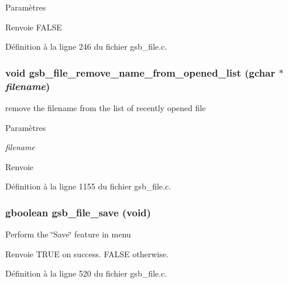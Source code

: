 \begin{DoxyParams}{Paramètres}
\item[{\em }]\end{DoxyParams}
\begin{DoxyReturn}{Renvoie}
FALSE 
\end{DoxyReturn}


Définition à la ligne 246 du fichier gsb\_\-file.c.

\subsubsection[{gsb\_\-file\_\-remove\_\-name\_\-from\_\-opened\_\-list}]{\setlength{\rightskip}{0pt plus 5cm}void gsb\_\-file\_\-remove\_\-name\_\-from\_\-opened\_\-list (gchar $\ast$ {\em filename})}\label{gsb__file_8c_a0ef446330135d6e1f04fea5e5f0cd190}
remove the filename from the list of recently opened file


\begin{DoxyParams}{Paramètres}
\item[{\em filename}]\end{DoxyParams}
\begin{DoxyReturn}{Renvoie}

\end{DoxyReturn}


Définition à la ligne 1155 du fichier gsb\_\-file.c.

\subsubsection[{gsb\_\-file\_\-save}]{\setlength{\rightskip}{0pt plus 5cm}gboolean gsb\_\-file\_\-save (void)}\label{gsb__file_8c_a986804bbb7d965c1f15c325de610a7ef}
Perform the \char`\"{}Save\char`\"{} feature in menu

\begin{DoxyReturn}{Renvoie}
TRUE on success. FALSE otherwise. 
\end{DoxyReturn}


Définition à la ligne 520 du fichier gsb\_\-file.c.

